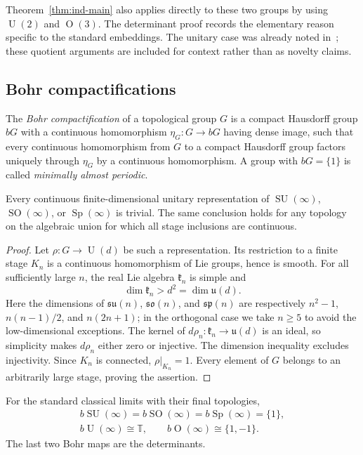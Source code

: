 Theorem~\ref{thm:ind-main} also applies directly to these two groups by
using $\operatorname{U}(2)$ and $\operatorname{O}(3)$. The determinant proof records the
elementary reason specific to the standard embeddings. The unitary
case was already noted in~\cite{CacciatoriUrsino2023}; these quotient
arguments are included for context rather than as novelty claims.


\subsection{Bohr compactifications}\label{sec:ind-bohr}

The \emph{Bohr compactification} of a topological group $G$ is a compact
Hausdorff group $bG$ with a continuous homomorphism $\eta_G:G\to bG$
having dense image, such that every continuous homomorphism from $G$
to a compact Hausdorff group factors uniquely through $\eta_G$ by a
continuous homomorphism. A group with $bG=\{1\}$ is called
\emph{minimally almost periodic}.

\begin{lemma}\label{lem:ind-no-finite-representations}
Every continuous finite-dimensional unitary representation of
$\operatorname{SU}(\infty)$, $\operatorname{SO}(\infty)$, or $\operatorname{Sp}(\infty)$ is trivial.
The same conclusion holds for any topology on the algebraic union
for which all stage inclusions are continuous.
\end{lemma}

\begin{proof}
Let $\rho:G\to\operatorname{U}(d)$ be such a representation. Its restriction to a
finite stage $K_n$ is a continuous homomorphism of Lie groups, hence
is smooth. For all sufficiently large $n$, the real Lie algebra
$\mathfrak k_n$ is simple and
\[
\dim\mathfrak k_n>d^2=\dim\mathfrak u(d).
\]
Here the dimensions of $\mathfrak{su}(n)$, $\mathfrak{so}(n)$, and
$\mathfrak{sp}(n)$ are respectively $n^2-1$, $n(n-1)/2$, and
$n(2n+1)$; in the orthogonal case we take $n\ge5$ to avoid the
low-dimensional exceptions. The kernel of
$d\rho_n:\mathfrak k_n\to\mathfrak u(d)$ is an ideal, so simplicity
makes $d\rho_n$ either zero or injective. The dimension inequality
excludes injectivity. Since $K_n$ is connected, $\rho|_{K_n}=1$.
Every element of $G$ belongs to an arbitrarily large stage, proving
the assertion.
\end{proof}

\begin{proposition}\label{prop:ind-bohr-classical}
For the standard classical limits with their final topologies,
\begin{gather*}
b\operatorname{SU}(\infty)=b\operatorname{SO}(\infty)=b\operatorname{Sp}(\infty)=\{1\},\\
b\operatorname{U}(\infty)\cong\mathbb T,\qquad b\operatorname{O}(\infty)\cong\{1,-1\}.
\end{gather*}
The last two Bohr maps are the determinants.
\end{proposition}

